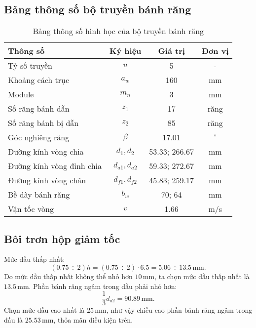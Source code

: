\subsection{Bảng thông số bộ truyền bánh răng}
\begin{table}[H]
    \centering
    \begin{tabular}{|l|c|c|c|}
        \hline
        \textbf{Thông số} & \textbf{Ký hiệu} & \textbf{Giá trị} & \textbf{Đơn vị} \\ \hline
        Tỷ số truyền & $u$ & 5 & - \\ \hline
        Khoảng cách trục & $a_w$ & 160 & mm \\ \hline
        Module & $m_n$ & 3 & mm \\ \hline
        Số răng bánh dẫn & $z_1$ & 17 & răng \\ \hline
        Số răng bánh bị dẫn & $z_2$ & 85 & răng \\ \hline
        Góc nghiêng răng & $\beta$ & 17.01 & $^\circ$ \\ \hline
        Đường kính vòng chia & $d_1, d_2$ & 53.33; 266.67 & mm \\ \hline
        Đường kính vòng đỉnh chia & $d_{a1}, d_{a2}$ & 59.33; 272.67 & mm \\ \hline
        Đường kính vòng chân & $d_{f1}, d_{f2}$ & 45.83; 259.17 & mm \\ \hline
        Bề dày bánh răng & $b_w$ & 70; 64 & mm \\ \hline
        Vận tốc vòng & $v$ & 1.66 & m/s \\ \hline
    \end{tabular}
    \caption{Bảng thông số hình học của bộ truyền bánh răng}
\end{table}
\subsection{Bôi trơn hộp giảm tốc}
Mức dầu thấp nhất:
\begin{equation}
    (0.75 \div 2)h = (0.75 \div 2) \cdot 6.5 = 5.06 \div 13.5 \, \text{mm}.
\end{equation}
Do mức dầu thấp nhất không thể nhỏ hơn $10 \, \text{mm}$, ta chọn mức dầu thấp nhất là $13.5 \, \text{mm}$. Phần bánh răng ngâm trong dầu phải nhỏ hơn:
\begin{equation}
    \frac{1}{3}d_{a2} = 90.89 \, \text{mm}.
\end{equation}
Chọn mức dầu cao nhất là $25 \, \text{mm}$, như vậy chiều cao phần bánh răng ngâm trong dầu là $25.53 \, \text{mm}$, thỏa mãn điều kiện trên.